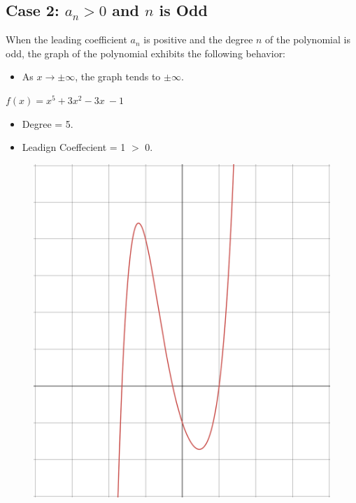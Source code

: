\subsection*{Case 2: \( a_n > 0 \) and \(n\) is Odd}


When the leading coefficient \( a_n \) is positive and the degree \( n \) of the polynomial is odd, the graph of the polynomial exhibits the following behavior:

\begin{itemize}
    \item As \( x \to \pm \infty \), the graph tends to \( \pm \infty \).
\end{itemize}


\begin{example}
\(f(x) = x^{5}+3x^{2}-3x\ -1\)
  \begin{itemize}
  \item Degree = 5.
  \item Leadign Coeffecient = 1 $>$ 0.
  \end{itemize}

\begin{figure}[H]
  \centering
  \includegraphics[scale=0.2]{"./fig/case_3.png"}
\end{figure}
\end{example}

